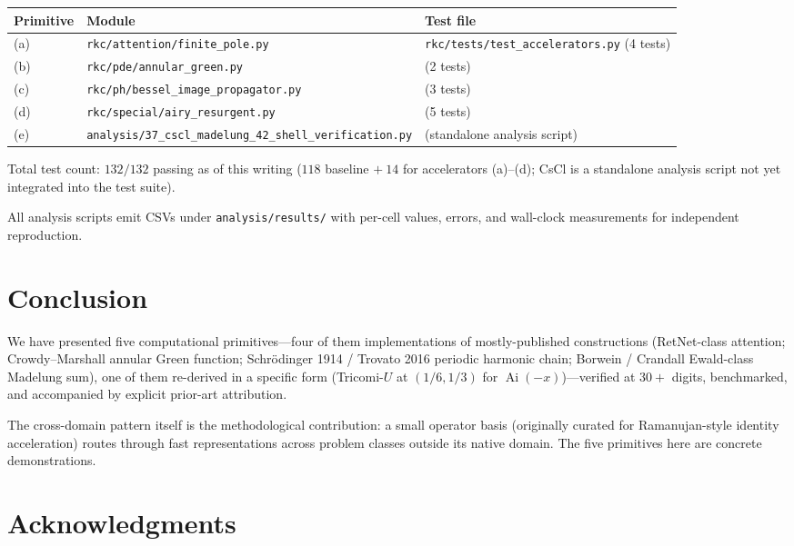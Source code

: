\documentclass[11pt,reqno]{amsart}
\theoremstyle{definition}
\DeclareMathOperator{\Ai}{Ai}
\begin{document}
\begin{center}
\begin{tabular}{lll}
\toprule
Primitive & Module & Test file \\
\midrule
(a) & \verb|rkc/attention/finite_pole.py| & \verb|rkc/tests/test_accelerators.py| (4 tests) \\
(b) & \verb|rkc/pde/annular_green.py| & (2 tests) \\
(c) & \verb|rkc/ph/bessel_image_propagator.py| & (3 tests) \\
(d) & \verb|rkc/special/airy_resurgent.py| & (5 tests) \\
(e) & \verb|analysis/37_cscl_madelung_42_shell_verification.py| & (standalone analysis script) \\
\bottomrule
\end{tabular}
\end{center}

Total test count: $132/132$ passing as of this writing
($118$ baseline $+\ 14$ for accelerators (a)--(d); CsCl is a standalone
analysis script not yet integrated into the test suite).

All analysis scripts emit CSVs under \verb|analysis/results/| with
per-cell values, errors, and wall-clock measurements for independent
reproduction.

\section{Conclusion}\label{sec:conclusion}

We have presented five computational primitives---four of them
implementations of mostly-published constructions (RetNet-class
attention; Crowdy--Marshall annular Green function; Schr\"odinger 1914
/ Trovato 2016 periodic harmonic chain; Borwein / Crandall Ewald-class
Madelung sum), one of them re-derived in a specific form (Tricomi-$U$
at $(1/6, 1/3)$ for $\Ai(-x)$)---verified at $30+$ digits, benchmarked,
and accompanied by explicit prior-art attribution.

The cross-domain pattern itself is the methodological contribution:
a small operator basis (originally curated for Ramanujan-style identity
acceleration) routes through fast representations across problem
classes outside its native domain. The five primitives here are
concrete demonstrations.

\section*{Acknowledgments}
\end{document}
